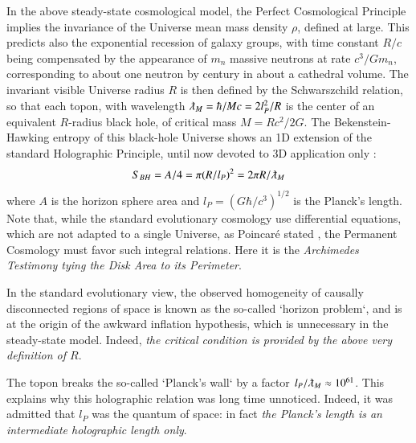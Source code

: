 \documentclass[twoside,draft]{article}
\begin{document}
\begin{sloppypar}
In the above steady-state cosmological model, the Perfect Cosmological Principle implies the invariance of the Universe mean mass density $\rho$, defined at large. This predicts also the exponential recession of galaxy groups, with time constant $R/c$ being compensated by the appearance of $m_n$ massive neutrons at rate $c^{3} /Gm_{n}$, 
corresponding to about one neutron by century in about a cathedral volume. 
The invariant visible Universe radius $R$ is then defined by the Schwarszchild relation, so that each topon, with wavelength $\lambdabar_M = \hbar/Mc = 2l_{P}^{2} /R$ is the center of an equivalent $R$-radius black hole, of critical mass $M = Rc^{2} /2G$. The Bekenstein-Hawking entropy of this black-hole Universe shows an 1D extension \cite{Sanchez1} of the standard Holographic Principle, until now devoted to 3D application only \cite{Bousso}:
\begin{equation}
S_{BH} = A/4 = \pi(R/l_{P})^{2} = 2\pi R/\lambdabar_{M}
\end{equation}
where $A$ is the horizon sphere area and $l_{P} = (G\hbar/c^{3} )^{1/2}$ is the Planck's length. Note that, while the standard evolutionary cosmology use differential equations, which are not adapted to a single Universe, as Poincar\'{e} stated \cite{Sanchez1}, the Permanent Cosmology must favor such integral relations. Here it is the \textit{Archimedes Testimony tying the Disk Area to its Perimeter}.

In the standard evolutionary view, the observed homogeneity of causally disconnected regions of space is known as the so-called `horizon problem`, and is at the origin of the awkward inflation hypothesis, which is unnecessary in the steady-state model. Indeed, \textit{the critical condition is provided by the above very definition of $R$}.

The topon breaks the so-called `Planck's wall` by a factor $l_{P}/\lambdabar_{M}\approx 10^{61}$. This explains why this holographic relation was long time unnoticed. Indeed, it was admitted that $l_{P}$ was the quantum of space: in fact \textit{the Planck's length is an intermediate holographic length only}.


\end{sloppypar}
\end{document}
